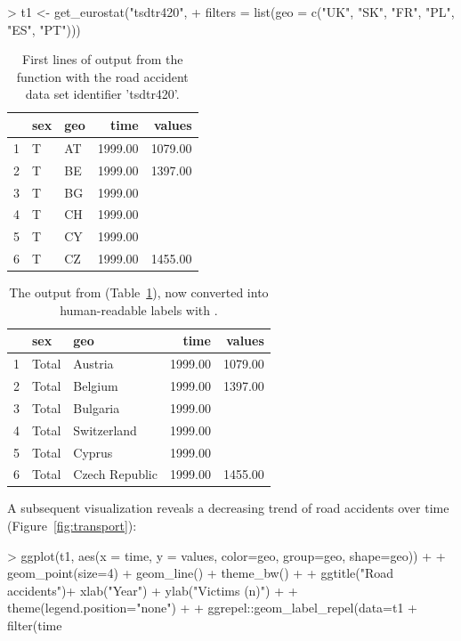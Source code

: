 \begin{example}
> t1 <- get_eurostat("tsdtr420", 
+   filters = list(geo = c("UK", "SK", "FR", "PL", "ES", "PT"))) 
\end{example}


\begin{table}[h!]
\centering
\begin{tabular}{rllrr}
\toprule
  \hline
  & sex & geo & time & values \\ 
  \hline
  1 & T & AT & 1999.00 & 1079.00 \\ 
  2 & T & BE & 1999.00 & 1397.00 \\ 
  3 & T & BG & 1999.00 &  \\ 
  4 & T & CH & 1999.00 &  \\ 
  5 & T & CY & 1999.00 &  \\ 
  6 & T & CZ & 1999.00 & 1455.00 \\ 
   \hline
\bottomrule      
\end{tabular}
\caption{First lines of output from the  function with the road accident data set identifier 'tsdtr420'.}
\label{tab:getdatatable}
\end{table}



\begin{table}[h!]
\centering
\begin{tabular}{rllrr}
\toprule
  \hline
  & sex & geo & time & values \\ 
  \hline
  1 & Total & Austria & 1999.00 & 1079.00 \\ 
  2 & Total & Belgium & 1999.00 & 1397.00 \\ 
  3 & Total & Bulgaria & 1999.00 &  \\ 
  4 & Total & Switzerland & 1999.00 &  \\ 
  5 & Total & Cyprus & 1999.00 &  \\ 
  6 & Total & Czech Republic & 1999.00 & 1455.00 \\ 
   \hline
\bottomrule   
\end{tabular}
\caption{The output from  (Table~\ref{tab:getdatatable}), now converted into human-readable labels with .}
\label{tab:getdatatable2}
\end{table}

\newpage

A subsequent visualization reveals a decreasing trend of road
accidents over time (Figure~\ref{fig:transport}):

\begin{example}
> ggplot(t1, aes(x = time, y = values, color=geo, group=geo, shape=geo)) +
+   geom_point(size=4) + geom_line() + theme_bw() +
+   ggtitle("Road accidents")+ xlab("Year") + ylab("Victims (n)") +
+   theme(legend.position="none") +
+   ggrepel::geom_label_repel(data=t1 %
+     filter(time %
\end{example}


